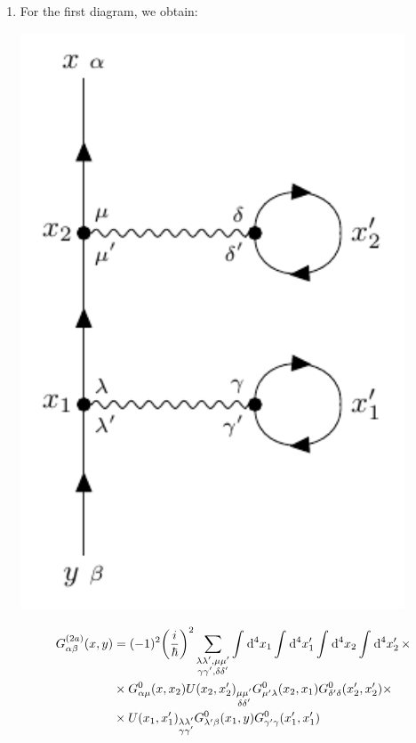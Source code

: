 \documentclass[11pt, a4paper, twoside, openright]{article}
\begin{document}
\begin{enumerate}[label=(\alph*)]
\item For the first diagram, we obtain:

\begin{minipage}[]{0.35\linewidth}
\centering
\includegraphics[width=0.9\textwidth]{images/A_label_c.pdf}
\label{}
\end{minipage}
\begin{minipage}[c]{0.65\linewidth}
\begin{equation}
\begin{split}
  G_{\alpha \beta }^{(2a)} (x,y) &= (-1)^2 \qty(\frac{i}{\hbar })^2
   \sum_{\substack{\lambda \lambda', \mu \mu' \\ \gamma \gamma', \delta \delta'   } }^{} \int_{}^{} \dd[4]{x_1} \int_{}^{} \dd[4]{x_1'} \int_{}^{} \dd[4]{x_2} \int_{}^{} \dd[4]{x_2'} \times \\
  & \times G_{\alpha \mu }^0 (x,x_2) U(x_2,x_2')_{\substack{ \mu \mu' \\ \delta \delta'} } G^0_{\mu' \lambda } (x_2,x_1) G^0_{\delta' \delta } (x_2',x_2') \times \\
  & \times U(x_1,x_1')_{\substack{ \lambda \lambda' \\ \gamma \gamma'} }
  G^0_{\lambda' \beta } (x_1,y) G^0_{\gamma' \gamma } (x_1',x_1')
\end{split}
\end{equation}
\end{minipage}


\end{enumerate}
\end{document}
